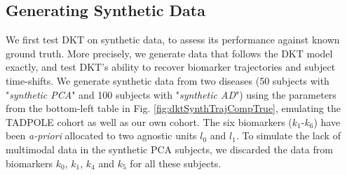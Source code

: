 \documentclass{llncs}
\DeclareMathOperator*{\argmin}{arg\,min}
\begin{document}



\subsection{Generating Synthetic Data}
\label{sec:dktMetSyn}

We first test DKT on synthetic data, to assess its performance against known ground truth. More precisely, we generate data that follows the DKT model exactly, and test DKT's ability to recover biomarker trajectories and subject time-shifts. We generate synthetic data from two diseases (50 subjects with "\emph{synthetic PCA}" and 100 subjects with "\emph{synthetic AD}") using the parameters from the bottom-left table in Fig. \ref{fig:dktSynthTrajCompTrue}, emulating the TADPOLE cohort as well as our own cohort. The six biomarkers ($k_1$-$k_6$) have been \emph{a-priori} allocated to two agnostic units $l_0$ and $l_1$. To simulate the lack of multimodal data in the synthetic PCA subjects, we discarded the data from biomarkers $k_0$, $k_1$, $k_4$ and $k_5$ for all these subjects. 

 
\end{document}

